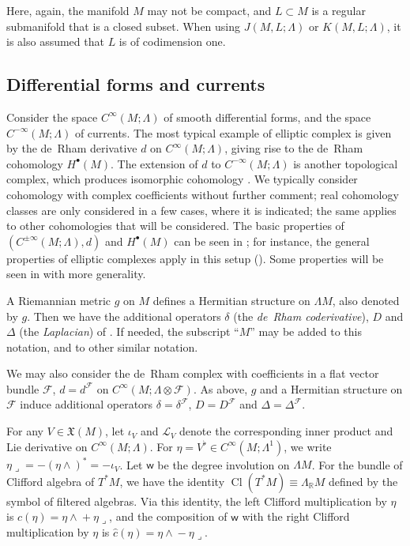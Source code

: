 \documentclass{memo-l}
\theoremstyle{plain}
\theoremstyle{definition}
\theoremstyle{remark}
\newcommand{\R}{\mathbb{R}}
\newcommand{\FF}{\mathcal{F}}
\newcommand{\LL}{\mathcal{L}}
\newcommand{\fX}{\mathfrak{X}}
\newcommand{\sw}{\mathsf{w}}
\newcommand{\Cl}{\operatorname{Cl}}
\numberwithin{section}{chapter}
\numberwithin{equation}{section}%
\begin{document}
Here, again, the manifold $M$ may not be compact, and $L\subset M$ is a regular submanifold that is a closed subset. When using $J(M,L;\Lambda)$ or $K(M,L;\Lambda)$, it is also assumed that $L$ is of codimension one. 

\subsection{Differential forms and currents}\label{ss: diff forms and currents}

Consider the space $C^\infty(M;\Lambda)$ of smooth differential forms, and the space $C^{-\infty}(M;\Lambda)$ of currents. The most typical example of elliptic complex is given by the de~Rham derivative $d$ on $C^\infty(M;\Lambda)$, giving rise to the de~Rham cohomology $H^\bullet(M)$. The extension of $d$ to $C^{-\infty}(M;\Lambda)$ is another topological complex, which produces isomorphic cohomology \cite{deRham1984}. We typically consider cohomology with complex coefficients without further comment; real cohomology classes are only considered in a few cases, where it is indicated; the same applies to other cohomologies that will be considered. The basic properties of  $(C^{\pm\infty}(M;\Lambda),d)$ and $H^\bullet(M)$ can be seen in \cite{deRham1984,BottTu1982}; for instance, the general properties of elliptic complexes apply in this setup (). Some properties will be seen in  with more generality.

A Riemannian metric $g$ on $M$ defines a Hermitian structure on $\Lambda M$, also denoted by $g$. Then we have the additional operators $\delta$ (the \emph{de~Rham coderivative}), $D$ and $\Delta$ (the \emph{Laplacian}) of . If needed, the subscript ``$M$'' may be added to this notation, and to other similar notation.

We may also consider the de~Rham complex with coefficients in a flat vector bundle $\FF$, $d=d^\FF$ on $C^\infty(M;\Lambda\otimes\FF)$. As above, $g$ and a Hermitian structure on $\FF$ induce additional operators $\delta=\delta^\FF$, $D=D^\FF$ and $\Delta=\Delta^\FF$.

For any $V\in\fX(M)$, let $\iota_V$ and $\LL_V$ denote the corresponding inner product and Lie derivative on $C^\infty(M;\Lambda)$. For $\eta=V^\flat\in C^\infty(M;\Lambda^1)$, we write ${\eta\lrcorner}=-(\eta\wedge)^*=-\iota_V$. Let $\sw$ be the degree involution on $\Lambda M$. For the bundle of Clifford algebra of $T^*M$, we have the identity $\Cl(T^*M)\equiv\Lambda_\R M$ defined by the symbol of filtered algebras. Via this identity, the left Clifford multiplication by $\eta$ is $c(\eta)={\eta\wedge}+{\eta\lrcorner}$, and the composition of $\sw$ with the right Clifford multiplication by $\eta$ is $\hat c(\eta)={\eta\wedge}-{\eta\lrcorner}$.
\end{document}
